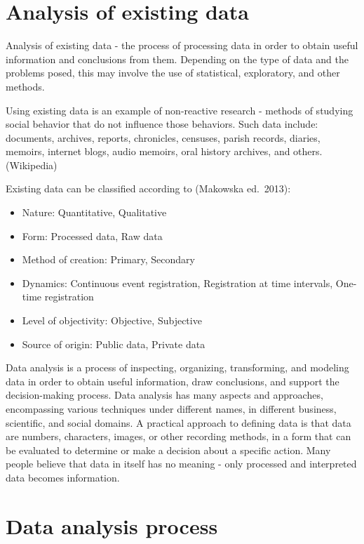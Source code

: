 \documentclass[
  english,
  letterpaper,
  DIV=11,
  numbers=noendperiod]{scrreprt}
\providecommand{\tightlist}{%
  \setlength{\itemsep}{0pt}\setlength{\parskip}{0pt}}
\begin{document}
\section{Analysis of existing data}\label{analysis-of-existing-data}

Analysis of existing data - the process of processing data in order to
obtain useful information and conclusions from them. Depending on the
type of data and the problems posed, this may involve the use of
statistical, exploratory, and other methods.

Using existing data is an example of non-reactive research - methods of
studying social behavior that do not influence those behaviors. Such
data include: documents, archives, reports, chronicles, censuses, parish
records, diaries, memoirs, internet blogs, audio memoirs, oral history
archives, and others. (Wikipedia)

Existing data can be classified according to (Makowska ed.~2013):

\begin{itemize}
\tightlist
\item
  Nature: Quantitative, Qualitative
\item
  Form: Processed data, Raw data
\item
  Method of creation: Primary, Secondary
\item
  Dynamics: Continuous event registration, Registration at time
  intervals, One-time registration
\item
  Level of objectivity: Objective, Subjective
\item
  Source of origin: Public data, Private data
\end{itemize}

Data analysis is a process of inspecting, organizing, transforming, and
modeling data in order to obtain useful information, draw conclusions,
and support the decision-making process. Data analysis has many aspects
and approaches, encompassing various techniques under different names,
in different business, scientific, and social domains. A practical
approach to defining data is that data are numbers, characters, images,
or other recording methods, in a form that can be evaluated to determine
or make a decision about a specific action. Many people believe that
data in itself has no meaning - only processed and interpreted data
becomes information.

\section{Data analysis process}\label{data-analysis-process}
\end{document}
